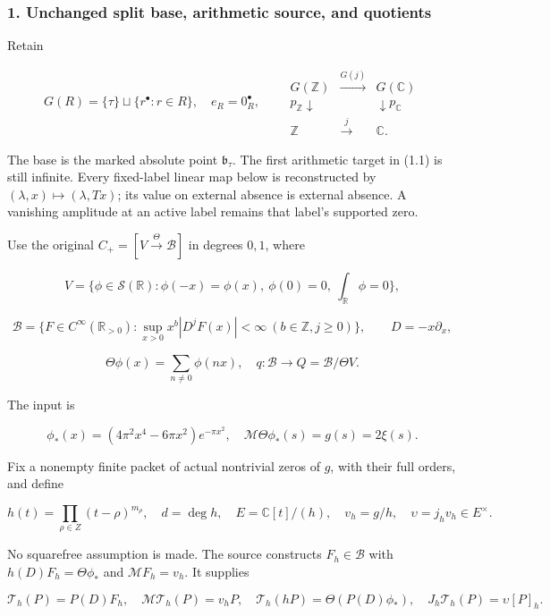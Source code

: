 \subsubsection{1. Unchanged split base, arithmetic source, and
quotients}\label{symmetric_frontier:unchanged-split-base-arithmetic-source-and-quotients}

Retain

\[G(R)=\{\tau\}\sqcup\{r^\bullet:r\in R\},\quad e_R=0_R^\bullet,\qquad
\begin{array}{ccc}
G(\mathbb Z)&\xrightarrow{G(j)}&G(\mathbb C)\\
p_{\mathbb Z}\downarrow&&\downarrow p_{\mathbb C}\\
\mathbb Z&\xrightarrow{j}&\mathbb C.
\end{array}\tag{1.1}\]

The base is the marked absolute point \(\mathfrak b_\tau\). The first
arithmetic target in (1.1) is still infinite. Every fixed-label linear
map below is reconstructed by \((\lambda,x)\mapsto(\lambda,Tx)\); its
value on external absence is external absence. A vanishing amplitude at
an active label remains that label's supported zero.

Use the original \(C_+=[V\xrightarrow\Theta\mathscr B]\) in degrees
\(0,1\), where

\[V=\{\phi\in\mathcal S(\mathbb R):\phi(-x)=\phi(x),\ \phi(0)=0,\ \int_{\mathbb R}\phi=0\},\]

\[\mathscr B=\{F\in C^\infty(\mathbb R_{>0}):\sup_{x>0}x^b|D^jF(x)|<\infty\ (b\in\mathbb Z,j\ge0)\},\qquad D=-x\partial_x,\]

\[\Theta\phi(x)=\sum_{n\ne0}\phi(nx),\quad q:\mathscr B\to Q=\mathscr B/\Theta V.\]

The input is

\[\phi_*(x)=(4\pi^2x^4-6\pi x^2)e^{-\pi x^2},\quad
\mathcal M\Theta\phi_*(s)=g(s)=2\xi(s).\]

Fix a nonempty finite packet of actual nontrivial zeros of \(g\), with
their full orders, and define

\[h(t)=\prod_{\rho\in Z}(t-\rho)^{m_\rho},\quad d=\deg h,\quad E=\mathbb C[t]/(h),\quad
v_h=g/h,\quad \upsilon=j_hv_h\in E^\times.\tag{1.2}\]

No squarefree assumption is made. The source constructs
\(F_h\in\mathscr B\) with \(h(D)F_h=\Theta\phi_*\) and
\(\mathcal MF_h=v_h\). It supplies

\[\mathcal T_h(P)=P(D)F_h,\quad
\mathcal M\mathcal T_h(P)=v_hP,\quad
\mathcal T_h(hP)=\Theta(P(D)\phi_*),\quad J_h\mathcal T_h(P)=\upsilon[P]_h.\tag{1.3}\]

